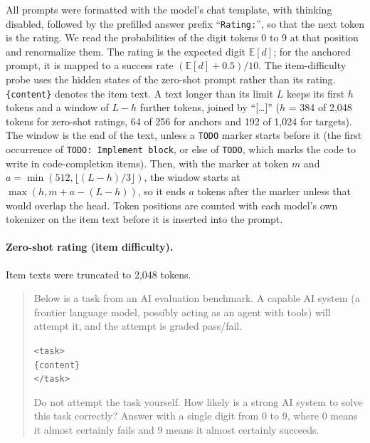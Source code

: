 \documentclass{article}
\newenvironment{promptbox}{\begin{quote}\small}{\end{quote}}
\begin{document}
All prompts were formatted with the model's chat template, with thinking disabled, followed by the prefilled answer prefix ``\texttt{Rating:\textvisiblespace}'', so that the next token is the rating. We read the probabilities of the digit tokens 0 to 9 at that position and renormalize them. The rating is the expected digit $\mathbb{E}[d]$; for the anchored prompt, it is mapped to a success rate $(\mathbb{E}[d] + 0.5)/10$. The item-difficulty probe uses the hidden states of the zero-shot prompt rather than its rating. \texttt{\{content\}} denotes the item text. A text longer than its limit $L$ keeps its first $h$ tokens and a window of $L - h$ further tokens, joined by ``[\ldots]'' ($h$ = 384 of 2,048 tokens for zero-shot ratings, 64 of 256 for anchors and 192 of 1,024 for targets). The window is the end of the text, unless a \texttt{TODO} marker starts before it (the first occurrence of \texttt{TODO: Implement block}, or else of \texttt{TODO}, which marks the code to write in code-completion items). Then, with the marker at token $m$ and $a = \min(512, \lfloor (L - h)/3 \rfloor)$, the window starts at $\max(h, m + a - (L - h))$, so it ends $a$ tokens after the marker unless that would overlap the head. Token positions are counted with each model's own tokenizer on the item text before it is inserted into the prompt.

\paragraph{Zero-shot rating (item difficulty).} Item texts were truncated to 2,048 tokens.
\begin{promptbox}
Below is a task from an AI evaluation benchmark. A capable AI system (a frontier language model, possibly acting as an agent with tools) will attempt it, and the attempt is graded pass/fail.

\texttt{<task>}\\
\texttt{\{content\}}\\
\texttt{</task>}

Do not attempt the task yourself. How likely is a strong AI system to solve this task correctly? Answer with a single digit from 0 to 9, where 0 means it almost certainly fails and 9 means it almost certainly succeeds.
\end{promptbox}
\end{document}
